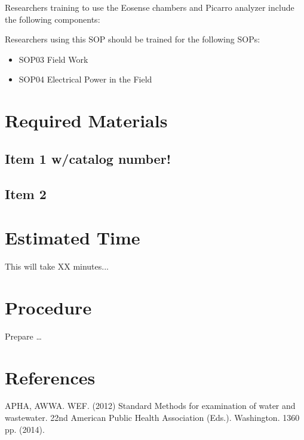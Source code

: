 \documentclass[12pt]{../SOP3_beta}
\begin{document}
Researchers training to use the Eosense chambers and Picarro analyzer include the following components: 



Researchers using this SOP should be trained for the following SOPs:

\begin{itemize}
  \item SOP03 Field Work
  \item SOP04 Electrical Power in the Field
\end{itemize}

\section{Required Materials}

\subsection{Item 1 w/catalog number!}
\subsection{Item 2}

\section{Estimated Time}

\NP This will take XX minutes...

\section{Procedure}

\NP Prepare \dots

\NP

\section{References}

\NP APHA, AWWA. WEF. (2012) Standard Methods for examination of water and wastewater. 22nd American Public Health Association (Eds.). Washington. 1360 pp. (2014).
\end{document}
